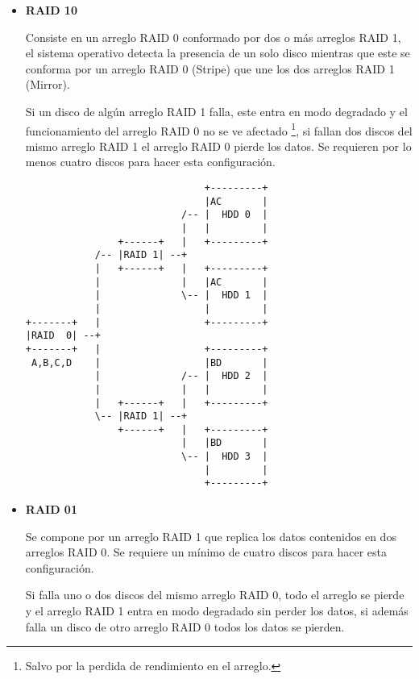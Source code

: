 \begin{itemize}

  \item \textbf{RAID 10}

Consiste en un arreglo \textsc{RAID} 0 conformado por dos o m\'{a}s arreglos \textsc{RAID} 1, el sistema operativo detecta la presencia de un solo disco mientras que este se conforma por un arreglo \textsc{RAID} 0 (Stripe) que une los dos arreglos \textsc{RAID} 1 (Mirror).

Si un disco de alg\'{u}n arreglo \textsc{RAID} 1 falla, este entra en modo degradado y el funcionamiento del arreglo \textsc{RAID} 0 no se ve afectado \footnote{Salvo por la perdida de rendimiento en el arreglo.}, si fallan dos discos del mismo arreglo \textsc{RAID} 1 el arreglo \textsc{RAID} 0 pierde los datos. Se requieren por lo menos cuatro discos para hacer esta configuraci\'{o}n.

{
\scriptsize
\linespread{1}
\begin{verbatim}
                               +---------+
                               |AC       |
                           /-- |  HDD 0  |
                           |   |         |
                +------+   |   +---------+
            /-- |RAID 1| --+
            |   +------+   |   +---------+
            |              |   |AC       |
            |              \-- |  HDD 1  |
            |                  |         |
+-------+   |                  +---------+
|RAID  0| --+
+-------+   |                  +---------+
 A,B,C,D    |                  |BD       |
            |              /-- |  HDD 2  |
            |              |   |         |
            |   +------+   |   +---------+
            \-- |RAID 1| --+
                +------+   |   +---------+
                           |   |BD       |
                           \-- |  HDD 3  |
                               |         |
                               +---------+
\end{verbatim}
}

  \item \textbf{RAID 01}

Se compone por un arreglo \textsc{RAID} 1 que replica los datos contenidos en dos arreglos \textsc{RAID} 0. Se requiere un m\'{i}nimo de cuatro discos para hacer esta configuraci\'{o}n.

Si falla uno o dos discos del mismo arreglo \textsc{RAID} 0, todo el arreglo se pierde y el arreglo \textsc{RAID} 1 entra en modo degradado sin perder los datos, si adem\'{a}s falla un disco de otro arreglo \textsc{RAID} 0 todos los datos se pierden.


\end{itemize}
